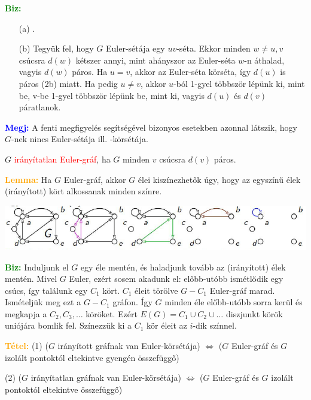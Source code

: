 \documentclass[../../szobeli.tex]{subfiles}
\begin{document}
\begin{itemize}
        \textcolor{green}{\textbf{Biz:}} \begin{itemize}
            \item[(a)] \checkmark.
            \item[(b)] Tegyük fel, hogy $G$ Euler-sétája egy $uv$-séta. Ekkor minden $w \neq u,v$ csúcsra $d(w)$ kétszer annyi, mint ahányszor az Euler-séta $w$-n áthalad, vagyis $d(w)$ páros. Ha $u = v$, akkor az Euler-séta körséta, így $d(u)$ is páros (2b) miatt. Ha pedig $u \neq v$, akkor $u$-ból 1-gyel többször lépünk ki, mint be, v-be 1-gyel többször lépünk be, mint ki, vagyis $d(u)$ és $d(v)$ páratlanok.  
        \end{itemize}
        
         

        \textcolor{blue}{\textbf{Megj:}} A fenti megfigyelés segítségével bizonyos esetekben azonnal látszik, hogy $G$-nek nincs Euler-sétája ill. -körsétája.

        $G$ \textcolor{red}{irányítatlan Euler-gráf}, ha $G$ minden $v$ csúcsra $d(v)$ páros.

        \textcolor{orange}{\textbf{Lemma:}} Ha $G$ Euler-gráf, akkor $G$ élei kiszínezhetők úgy, hogy az egyszínű élek (irányított) kört alkossanak minden színre.

        \includegraphics[width=\textwidth]{img/2.png}

        \textcolor{green}{\textbf{Biz:}} Induljunk el $G$ egy éle mentén, és haladjunk tovább az (irányított) élek mentén. Mivel $G$ Euler, ezért sosem akadunk el: előbb-utóbb ismétlődik egy csúcs, így találunk egy $C_1$ kört. $C_1$ éleit törölve $G-C_1$ Euler-gráf marad. Ismételjük meg ezt a $G-C_1$ gráfon. Így $G$ minden éle előbb-utóbb sorra kerül és megkapja a $C_2, C_3, \dots$ köröket. Ezért $E(G) = C_1 \cup C_2 \cup \dots$ diszjunkt körök uniójára bomlik fel. Színezzük ki a $C_1$ kör éleit az $i$-dik színnel.  

        \textcolor{orange}{\textbf{Tétel:}} (1) ($G$ irányított gráfnak van Euler-körsétája) $\Longleftrightarrow$ ($G$ Euler-gráf és $G$ izolált pontoktól eltekintve gyengén összefüggő) 
        
        (2) ($G$ irányítatlan gráfnak van Euler-körsétája) $\Longleftrightarrow$ ($G$ Euler-gráf és $G$ izolált pontoktól eltekintve összefüggő)


\end{itemize}
\end{document}
